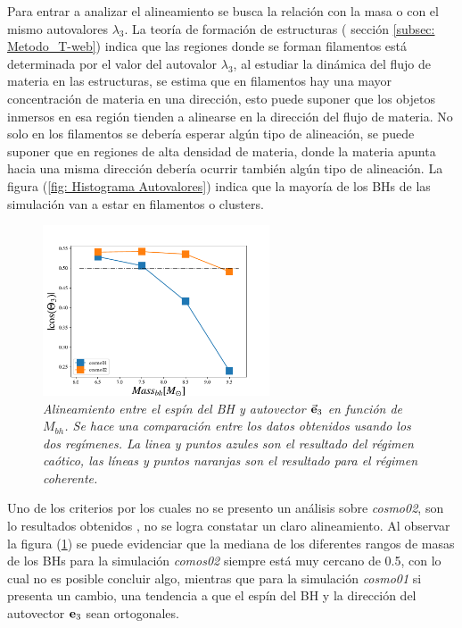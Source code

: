 Para entrar a analizar el alineamiento se busca la relación con la masa o con el mismo autovalores $\lambda_{3}$. 
La teoría de formación de estructuras ( sección \ref{subsec: Metodo_T-web}) indica que las regiones donde se forman filamentos está determinada por el valor del autovalor  $\lambda_{3}$, al estudiar la dinámica del flujo de materia en las estructuras, se estima  que en filamentos hay una mayor concentración de materia en una dirección, esto puede suponer que los objetos inmersos en esa región tienden a alinearse en la dirección del flujo de materia. No solo en los filamentos se debería esperar algún tipo de alineación, se puede suponer que en regiones de alta densidad de materia, donde la materia apunta hacia una misma dirección debería ocurrir también algún tipo de alineación. La figura (\ref{fig: Histograma Autovalores}) indica que la mayoría de los BHs de las simulación van a estar en filamentos o clusters. 

\begin{figure}
    \centering
    \includegraphics[width=0.6\textwidth]{./figures/6_Resultados/cosmo01/relacion_simulaciones_Mass_bh.pdf}
    \caption[Alineamiento entre el espín del BH y autovector $\vec{\bf{e}}_3$ en función de $M_{bh}$]{\emph{Alineamiento entre el espín del BH y autovector $\vec{\bf{e}}_3$ en función de $M_{bh}$. Se hace una comparación entre los datos obtenidos usando los dos regímenes. La linea y puntos azules son el resultado del régimen caótico, las líneas y puntos naranjas son el resultado para el régimen coherente.}}
    \label{fig: comparacion cosmo01 y cosmo02}
\end{figure}
 
Uno de los criterios por los cuales no se presento un análisis sobre {\it{cosmo02}}, son lo resultados obtenidos 
, no se logra constatar un claro  alineamiento. Al observar la figura (\ref{fig: comparacion cosmo01 y cosmo02}) se puede evidenciar que la mediana de los diferentes rangos de masas de los BHs para la simulación {\it{comos02}} siempre está muy cercano de 0.5, con lo cual no es posible concluir algo, mientras que para la simulación {\it{cosmo01}} si presenta un cambio, una tendencia a que el espín del BH y la dirección del autovector ${\bf{e}}_{3}$ sean ortogonales. 

